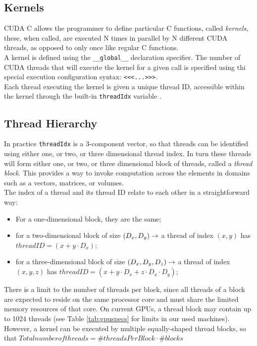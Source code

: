 	\subsection{Kernels} 
	CUDA C allows the programmer to define particular C functions, called \textit{kernels},	these, when called, are executed N times in parallel by N different CUDA threads, as	opposed to only once like regular C functions.\\
	
	A kernel is defined using the \texttt{\_\_global\_\_} declaration specifier. The number of CUDA threads that will execute the kernel for a given call is specified using thi special execution configuration syntax: 
	\texttt{<<<...>>>}.\\
	
	Each thread executing the kernel is given a unique thread ID, accessible within the kernel through the built-in \texttt{threadIdx} variable \cite{cudaguide}.
	
	\subsection{Thread Hierarchy}  
	In practice \texttt{threadIdx} is a 3-component vector, so that threads can be identified using either  one, or two, or three dimensional thread index.
	In turn these threads will form	either  one, or two, or three dimensional block of threads, called a
	\textit{thread block}.
	This provides a way to invoke computation across the elements in domains such as a vectors, matrices, or volumes.\\
	The index of a thread and its thread ID relate to each other in a straightforward way:
	\begin{itemize}
		\item For a one-dimensional block, they are the same; 
		
		\item for a two-dimensional block of size \((D_{x} ,	D_{y}) \space \rightarrow \space\)  a thread of index \((x, y)\) has \(threadID = (x + y \cdot D_{x} );\)
		
		\item for a three-dimensional block of size \((D_{x} ,	D_{y} ,	D_{z}) \space \rightarrow \space\)  a thread of index \((x, y, z)\) has \(threadID = (x + y \cdot D_{x} + z \cdot D_{x} \cdot D_{y});\)
		

	\end{itemize}
	 
	
	There is a limit to the number of threads per block, since all threads of a block are expected to reside on the same processor core and must share the limited memory resources of that core. On current GPUs, a thread block may contain up to 1024 threads (see Table \ref{tab:gpuspecs} for limits in our used machines).\\
	However, a kernel can be executed by multiple equally-shaped thread blocks, so that
	\(Total number of threads = \#threadsPerBlock \cdot \#blocks\)
	 
